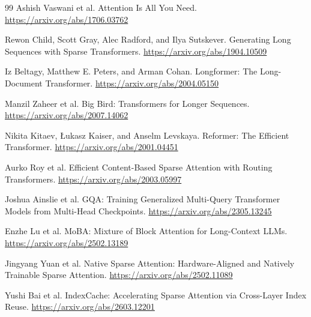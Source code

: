 \documentclass[11pt]{article}
\begin{document}
\begin{thebibliography}{99}
Ashish Vaswani et al.
\newblock Attention Is All You Need.
\newblock \url{https://arxiv.org/abs/1706.03762}

Rewon Child, Scott Gray, Alec Radford, and Ilya Sutskever.
\newblock Generating Long Sequences with Sparse Transformers.
\newblock \url{https://arxiv.org/abs/1904.10509}

Iz Beltagy, Matthew E. Peters, and Arman Cohan.
\newblock Longformer: The Long-Document Transformer.
\newblock \url{https://arxiv.org/abs/2004.05150}

Manzil Zaheer et al.
\newblock Big Bird: Transformers for Longer Sequences.
\newblock \url{https://arxiv.org/abs/2007.14062}

Nikita Kitaev, \L ukasz Kaiser, and Anselm Levskaya.
\newblock Reformer: The Efficient Transformer.
\newblock \url{https://arxiv.org/abs/2001.04451}

Aurko Roy et al.
\newblock Efficient Content-Based Sparse Attention with Routing Transformers.
\newblock \url{https://arxiv.org/abs/2003.05997}

Joshua Ainslie et al.
\newblock GQA: Training Generalized Multi-Query Transformer Models from Multi-Head Checkpoints.
\newblock \url{https://arxiv.org/abs/2305.13245}

Enzhe Lu et al.
\newblock MoBA: Mixture of Block Attention for Long-Context LLMs.
\newblock \url{https://arxiv.org/abs/2502.13189}

Jingyang Yuan et al.
\newblock Native Sparse Attention: Hardware-Aligned and Natively Trainable Sparse Attention.
\newblock \url{https://arxiv.org/abs/2502.11089}

Yushi Bai et al.
\newblock IndexCache: Accelerating Sparse Attention via Cross-Layer Index Reuse.
\newblock \url{https://arxiv.org/abs/2603.12201}
\end{thebibliography}
\end{document}
